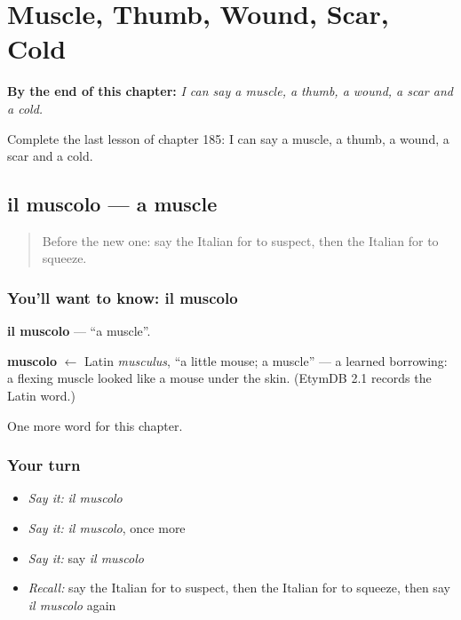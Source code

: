 
\chapter{Muscle, Thumb, Wound, Scar, Cold}
\label{ch:it-muscle-thumb-wound-scar-cold}

\begin{chapteropening}
\textbf{By the end of this chapter:} \emph{I can say a muscle, a thumb, a wound, a scar and a cold.}

Complete the last lesson of chapter 185: I can say a muscle, a thumb, a wound, a scar and a cold.
\end{chapteropening}

\section[il muscolo]{il muscolo — a muscle}

\label{lesson:IT-C185-muscolo}



\begin{quote}
Before the new one: say the Italian for to suspect, then the Italian for to squeeze.
\end{quote}

\subsection*{You'll want to know: il muscolo}
\textbf{il muscolo} — \textquotedblleft{}a muscle\textquotedblright{}.

\begin{cousinweb}
\textbf{muscolo} $\leftarrow$ Latin \emph{musculus}, \textquotedblleft{}a little mouse; a muscle\textquotedblright{} — a learned borrowing: a flexing muscle looked like a mouse under the skin. (EtymDB 2.1 records the Latin word.)
\end{cousinweb}

\begin{grammarlens}[title={What you've built}]
One more word for this chapter.
\end{grammarlens}

\subsection*{Your turn}
\begin{itemize}
\raggedright
  \item \emph{Say it:} \emph{il muscolo}
  \item \emph{Say it:} \emph{il muscolo}, once more
  \item \emph{Say it:} say \emph{il muscolo}
  \item \emph{Recall:} say the Italian for to suspect, then the Italian for to squeeze, then say \emph{il muscolo} again
\end{itemize}

